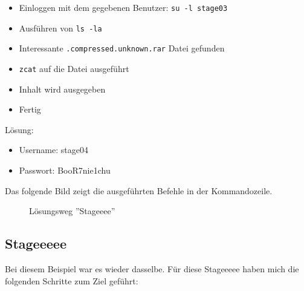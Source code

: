 \documentclass[12pt, a4paper, titlepage, oneside]{scrartcl}
\begin{document}
	\begin{itemize}
		\item Einloggen mit dem gegebenen Benutzer: \lstinline{su -l stage03}

		\item Ausführen von \lstinline{ls -la}

		\item Interessante \lstinline{.compressed.unknown.rar} Datei gefunden

		\item \lstinline{zcat} auf die Datei ausgeführt

		\item Inhalt wird ausgegeben

		\item Fertig
	\end{itemize}

	Lösung:
	\begin{itemize}
		\item Username: stage04

		\item Passwort: BooR7nie1chu
	\end{itemize}

	Das folgende Bild zeigt die ausgeführten Befehle in der Kommandozeile.
	\begin{figure}[h!]
		\centering
		\caption{Lösungsweg ''Stageeee''}
		\label{fig:stageeee_solution}
	\end{figure}

	\newpage

	\subsection{Stageeeee}
	Bei diesem Beispiel war es wieder dasselbe. Für diese Stageeeee haben mich die
	folgenden Schritte zum Ziel geführt:
\end{document}
